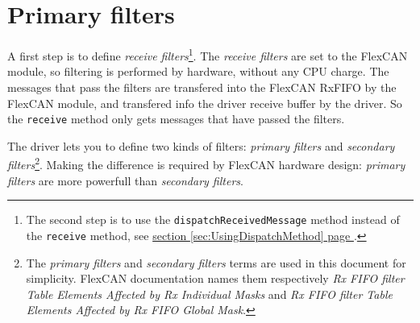 \documentclass[10pt, a4paper, obeyspaces, openany]{extarticle}
\newcommand \sectionLabel[2]{\section{#1}\label{sec:#2}}
\newcommand\refSectionPage[1]{\hyperref[sec:#1]{section \ref*{sec:#1} page \pageref{sec:#1}}}
\begin{document}
%
%
%
%



\sectionLabel{Primary filters}{primaryFilters}

A first step is to define \emph{receive filters}\footnote{The second step is to use the \texttt{dispatchReceivedMessage} method instead of the \texttt{receive} method, see \refSectionPage{UsingDispatchMethod}.}. The \emph{receive filters} are set to the FlexCAN module, so filtering is performed by hardware, without any CPU charge. The messages that pass the filters are transfered into the FlexCAN RxFIFO by the FlexCAN module, and transfered info the driver receive buffer by the driver. So the \texttt{receive} method only gets messages that have passed the filters.

The driver lets you to define two kinds of filters: \emph{primary filters} and \emph{secondary filters}\footnote{The \emph{primary filters} and \emph{secondary filters} terms are used in this document for simplicity. FlexCAN documentation names them respectively \emph{Rx FIFO filter Table Elements Affected by Rx Individual Masks} and \emph{Rx FIFO filter Table Elements Affected by Rx FIFO Global Mask}.}. Making the difference is required by FlexCAN hardware design: \emph{primary filters} are more powerfull than \emph{secondary filters}.
\end{document}
